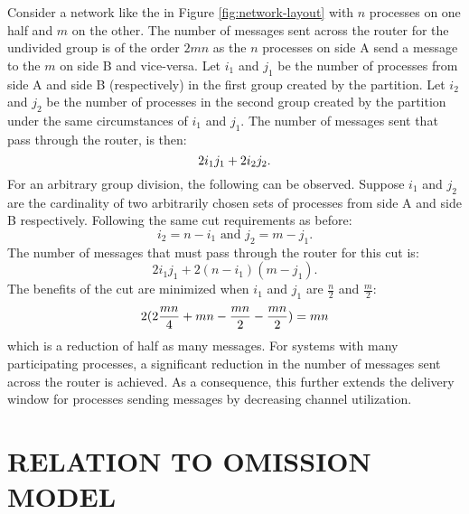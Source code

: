 Consider a network like the in Figure \ref{fig:network-layout} with $n$ processes on one half and $m$ on the other.
The number of messages sent across the router for the undivided group is of the order $2mn$ as the $n$ processes on side A send a message to the $m$ on side B and vice-versa.
Let $i_{1}$ and $j_{1}$ be the number of processes from side A and side B (respectively) in the first group created by the partition.
Let $i_{2}$ and $j_{2}$ be the number of processes in the second group created by the partition under the same circumstances of $i_1$ and $j_1$.
The number of messages sent that pass through the router, is then: 
\vspace{24pt}
\begin{equation}
2 i_{1} j_{1} + 2 i_{2} j_{2}.
\vspace{12pt}
\end{equation}
For an arbitrary group division, the following can be observed.
Suppose $i_{1}$ and $j_{2}$ are the cardinality of two arbitrarily chosen sets of processes from side A and side B respectively.
Following the same cut requirements as before:
\begin{equation}
i_2 = n - i_1 \text{ and } j_2 = m - j_1.
\end{equation}
The number of messages that must pass through the router for this cut is:
\begin{equation}
2 i_{1} j_{1} + 2 (n-i_{1}) (m-j_{1}).
\end{equation}
The benefits of the cut are minimized when $i_1$ and $j_1$ are $\frac{n}{2}$ and $\frac{m}{2}$:
\vspace{6pt}
\begin{equation}
2( 2 \frac{mn}{4} + mn - \frac{mn}{2} - \frac{mn}{2}) = mn
\vspace{10pt}
\end{equation}%
which is a reduction of half as many messages.
For systems with many participating processes, a significant reduction in the number of messages sent across the router is achieved.
As a consequence, this further extends the delivery window for processes sending messages by decreasing channel utilization.

\section{RELATION TO OMISSION MODEL}

